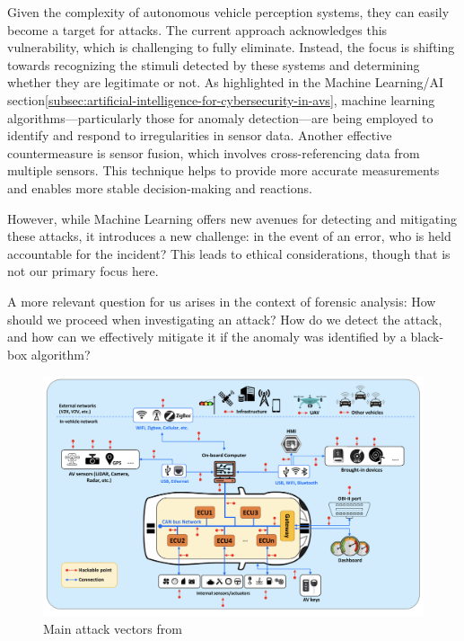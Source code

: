 Given the complexity of autonomous vehicle perception systems, they can easily become a target for attacks.
The current approach acknowledges this vulnerability, which is challenging to fully eliminate.
Instead, the focus is shifting towards recognizing the stimuli detected by these systems and determining whether they are legitimate or not.
As highlighted in the Machine Learning/AI section\ref{subsec:artificial-intelligence-for-cybersecurity-in-avs}, machine learning algorithms—particularly those for anomaly detection—are being employed to identify and respond to irregularities in sensor data.
Another effective countermeasure is sensor fusion, which involves cross-referencing data from multiple sensors.
This technique helps to provide more accurate measurements and enables more stable decision-making and reactions.

However, while Machine Learning offers new avenues for detecting and mitigating these attacks, it introduces a new challenge: in the event of an error, who is held accountable for the incident?
This leads to ethical considerations, though that is not our primary focus here.

A more relevant question for us arises in the context of forensic analysis: How should we proceed when investigating an attack?
How do we detect the attack, and how can we effectively mitigate it if the anomaly was identified by a black-box algorithm?\cite{cybersecurity2022forensics}


\begin{figure}[!htb]
    \centering
    \includegraphics[width=0.7\linewidth]{figures/vectors}
    \caption{Main attack vectors from \cite{bendiab2023autonomous}}
    \label{fig:attack-vectors}
\end{figure}